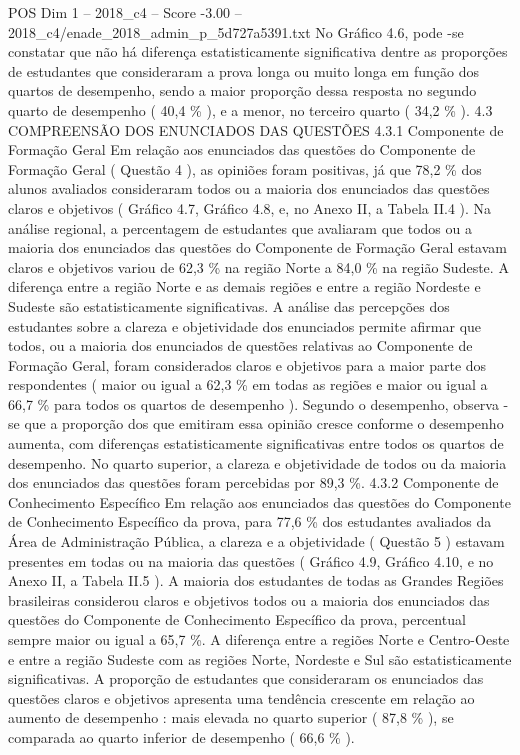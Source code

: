 \begin{textsample}{POS Dim 1 – 2018\_c4 – Score -3.00 – 2018\_c4/enade\_2018\_admin\_p\_5d727a5391.txt}
No Gráfico 4.6, pode -se constatar que não há diferença estatisticamente significativa dentre as proporções de estudantes que consideraram a prova longa ou muito longa em função dos quartos de desempenho, sendo a maior proporção dessa resposta no segundo quarto de desempenho ( 40,4 \% ), e a menor, no terceiro quarto ( 34,2 \% ). 4.3 COMPREENSÃO DOS ENUNCIADOS DAS QUESTÕES 4.3.1 Componente de Formação Geral Em relação aos enunciados das questões do Componente de Formação Geral ( Questão 4 ), as opiniões foram positivas, já que 78,2 \% dos alunos avaliados consideraram todos ou a maioria dos enunciados das questões claros e objetivos ( Gráfico 4.7, Gráfico 4.8, e, no Anexo II, a Tabela II.4 ).
Na análise regional, a percentagem de estudantes que avaliaram que todos ou a maioria dos enunciados das questões do Componente de Formação Geral estavam claros e objetivos variou de 62,3 \% na região Norte a 84,0 \% na região Sudeste.
A diferença entre a região Norte e as demais regiões e entre a região Nordeste e Sudeste são estatisticamente significativas.
A análise das percepções dos estudantes sobre a clareza e objetividade dos enunciados permite afirmar que todos, ou a maioria dos enunciados de questões relativas ao Componente de Formação Geral, foram considerados claros e objetivos para a maior parte dos respondentes ( maior ou igual a 62,3 \% em todas as regiões e maior ou igual a 66,7 \% para todos os quartos de desempenho ).
Segundo o desempenho, observa -se que a proporção dos que emitiram essa opinião cresce conforme o desempenho aumenta, com diferenças estatisticamente significativas entre todos os quartos de desempenho.
No quarto superior, a clareza e objetividade de todos ou da maioria dos enunciados das questões foram percebidas por 89,3 \%. 4.3.2 Componente de Conhecimento Específico Em relação aos enunciados das questões do Componente de Conhecimento Específico da prova, para 77,6 \% dos estudantes avaliados da Área de Administração Pública, a clareza e a objetividade ( Questão 5 ) estavam presentes em todas ou na maioria das questões ( Gráfico 4.9, Gráfico 4.10, e no Anexo II, a Tabela II.5 ).
A maioria dos estudantes de todas as Grandes Regiões brasileiras considerou claros e objetivos todos ou a maioria dos enunciados das questões do Componente de Conhecimento Específico da prova, percentual sempre maior ou igual a 65,7 \%.
A diferença entre a regiões Norte e Centro-Oeste e entre a região Sudeste com as regiões Norte, Nordeste e Sul são estatisticamente significativas.
A proporção de estudantes que consideraram os enunciados das questões claros e objetivos apresenta uma tendência crescente em relação ao aumento de desempenho : mais elevada no quarto superior ( 87,8 \% ), se comparada ao quarto inferior de desempenho ( 66,6 \% ).

\end{textsample}
